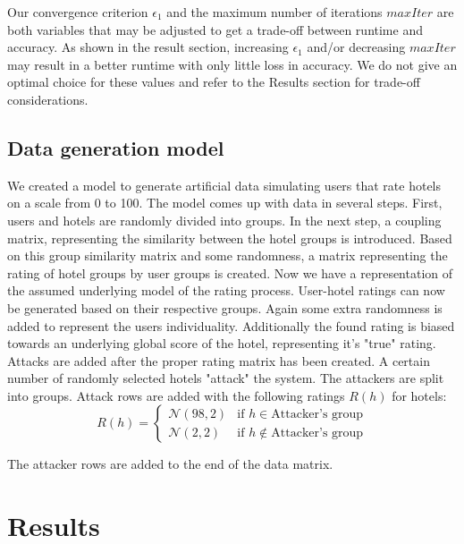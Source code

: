 \documentclass[10pt,conference,compsocconf]{IEEEtran}
\begin{document}
Our convergence criterion $\epsilon_1$ and the maximum number of iterations $maxIter$ are both variables that may be adjusted
to get a trade-off between runtime and accuracy. As shown in the result section, increasing $\epsilon_1$ and/or decreasing $maxIter$
may result in a better runtime with only little loss in accuracy. We do not give an optimal choice for these values and refer to the Results section for trade-off considerations.


\subsection{Data generation model}

We created a model to generate artificial data simulating users that rate hotels on a scale from 0 to 100. The model comes up with data in several steps. First, users and hotels are randomly divided into groups. In the next step, a coupling matrix, representing the similarity between the hotel groups is introduced. Based on this group similarity matrix and some randomness, a matrix representing the rating of hotel groups by user groups is created. Now we have a representation of the assumed underlying model of the rating process. User-hotel ratings can now be generated based on their respective groups. Again some extra randomness is added to represent the users individuality. Additionally the found rating is biased towards an underlying global score of the hotel, representing it's "true" rating.\\
Attacks are added after the proper rating matrix has been created. A certain number of randomly selected hotels "attack" the system. The attackers are split into groups. Attack rows are added with the following ratings $R(h)$ for hotels:
\begin{equation*}
R(h) =
\left\{
	\begin{array}{ll}
		\mathcal{N}(98,2)  & \mbox{if } h \in \mbox{Attacker's group} \\
		\mathcal{N}(2,2) & \mbox{if } h \notin \mbox{Attacker's group}
	\end{array}
\right.
\label{eq:}
\end{equation*}

The attacker rows are added to the end of the data matrix.


\section{Results}

\end{document}
